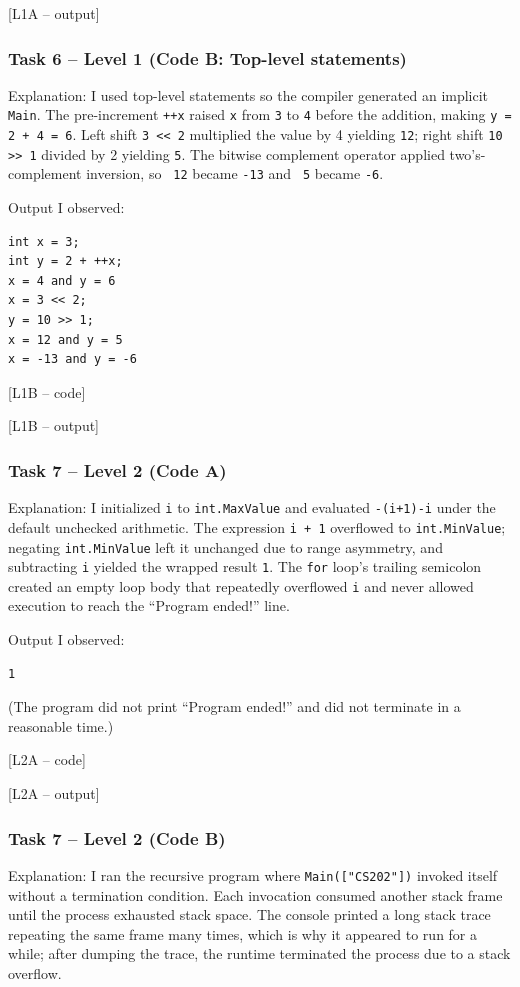 [L1A -- output]

\subsubsection{Task 6 -- Level 1 (Code B: Top-level statements)}
Explanation: I used top-level statements so the compiler generated an implicit \texttt{Main}. The pre-increment \texttt{++x} raised \texttt{x} from \texttt{3} to \texttt{4} before the addition, making \texttt{y = 2 + 4 = 6}. Left shift \texttt{3 << 2} multiplied the value by 4 yielding \texttt{12}; right shift \texttt{10 >> 1} divided by 2 yielding \texttt{5}. The bitwise complement operator applied two's-complement inversion, so \texttt{~12} became \texttt{-13} and \texttt{~5} became \texttt{-6}.

Output I observed:
\begin{verbatim}
int x = 3;
int y = 2 + ++x;
x = 4 and y = 6
x = 3 << 2;
y = 10 >> 1;
x = 12 and y = 5
x = -13 and y = -6
\end{verbatim}

[L1B -- code]

[L1B -- output]

\subsubsection{Task 7 -- Level 2 (Code A)}
Explanation: I initialized \texttt{i} to \texttt{int.MaxValue} and evaluated \texttt{-(i+1)-i} under the default unchecked arithmetic. The expression \texttt{i + 1} overflowed to \texttt{int.MinValue}; negating \texttt{int.MinValue} left it unchanged due to range asymmetry, and subtracting \texttt{i} yielded the wrapped result \texttt{1}. The \texttt{for} loop's trailing semicolon created an empty loop body that repeatedly overflowed \texttt{i} and never allowed execution to reach the ``Program ended!'' line.

Output I observed:
\begin{verbatim}
1
\end{verbatim}

(The program did not print ``Program ended!'' and did not terminate in a reasonable time.)

[L2A -- code]

[L2A -- output]

\subsubsection{Task 7 -- Level 2 (Code B)}
Explanation: I ran the recursive program where \texttt{Main(["CS202"])} invoked itself without a termination condition. Each invocation consumed another stack frame until the process exhausted stack space. The console printed a long stack trace repeating the same frame many times, which is why it appeared to run for a while; after dumping the trace, the runtime terminated the process due to a stack overflow.

